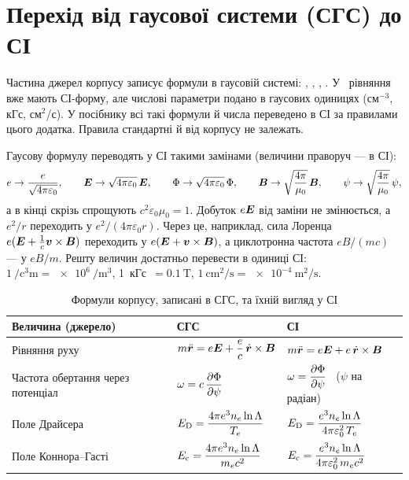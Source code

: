 \chapter{Перехід від гаусової системи (СГС) до СІ}\label{app:cgs}

Частина джерел корпусу записує формули в гаусовій системі: \cite{Moskvitina2010},
\cite{Sigmar1987}, \cite{Marchuk2025}, \cite{Tyshchenko2021}. У~\cite{Wong1987} рівняння вже мають СІ-форму,
але числові параметри подано в гаусових одиницях (см$^{-3}$, кГс, см$^2$/с). У посібнику всі
такі формули й числа переведено в СІ за правилами цього додатка. Правила стандартні й від корпусу не
залежать.

\begin{outofcorpus}
Гаусову формулу переводять у СІ такими замінами (величини праворуч --- в СІ):
\[
  e\to\frac{e}{\sqrt{4\pi\varepsilon_0}},\qquad
  \bm{E}\to\sqrt{4\pi\varepsilon_0}\,\bm{E},\qquad
  \Phi\to\sqrt{4\pi\varepsilon_0}\,\Phi,\qquad
  \bm{B}\to\sqrt{\frac{4\pi}{\mu_0}}\,\bm{B},\qquad
  \psi\to\sqrt{\frac{4\pi}{\mu_0}}\,\psi,
\]
а в кінці скрізь спрощують $c^2\varepsilon_0\mu_0=1$. Добуток $e\bm{E}$ від заміни не
змінюється, а $e^2/r$ переходить у $e^2/(4\pi\varepsilon_0 r)$. Через це, наприклад, сила Лоренца $e(\bm{E}+\frac1c\bm{v}\times\bm{B})$
переходить у $e(\bm{E}+\bm{v}\times\bm{B})$, а циклотронна частота $eB/(mc)$ --- у $eB/m$.
Решту величин достатньо перевести в одиниці СІ:
$\SI{1}{\per\cubic\centi\metre}=\SI{e6}{\per\cubic\metre}$,
1~кГс~$=\SI{0.1}{\tesla}$,
$\SI{1}{\centi\metre\squared\per\second}=\SI{e-4}{\metre\squared\per\second}$.
\end{outofcorpus}

\begin{table}[h]
\centering
\caption{Формули корпусу, записані в СГС, та їхній вигляд у СІ}\label{tab:cgs}
\begin{tabularx}{\textwidth}{@{}>{\raggedright\arraybackslash}p{3.4cm}>{\centering\arraybackslash}X>{\centering\arraybackslash}X@{}}
\toprule
Величина (джерело) & СГС & СІ \\
\midrule
Рівняння руху~\cite{Moskvitina2010} &
$m\ddot{\bm{r}}=e\bm{E}+\dfrac ec\,\dot{\bm{r}}\times\bm{B}$ &
$m\ddot{\bm{r}}=e\bm{E}+e\,\dot{\bm{r}}\times\bm{B}$ \\[6pt]
Частота обертання через потенціал~\cite{Sigmar1987} &
$\omega=c\,\dfrac{\partial\Phi}{\partial\psi}$ &
$\omega=\dfrac{\partial\Phi}{\partial\psi}$ \ ($\psi$ на радіан) \\[6pt]
Поле Драйсера~\cite{Marchuk2025} &
$E_{\mathrm{D}}=\dfrac{4\pi e^3n_e\ln\Lambda}{T_e}$ &
$E_{\mathrm{D}}=\dfrac{e^3n_e\ln\Lambda}{4\pi\varepsilon_0^2\,T_e}$ \\[6pt]
Поле Коннора--Гасті~\cite{Marchuk2025} &
$E_{\mathrm{c}}=\dfrac{4\pi e^3n_e\ln\Lambda}{m_ec^2}$ &
$E_{\mathrm{c}}=\dfrac{e^3n_e\ln\Lambda}{4\pi\varepsilon_0^2\,m_ec^2}$ \\
\bottomrule
\end{tabularx}
\end{table}

